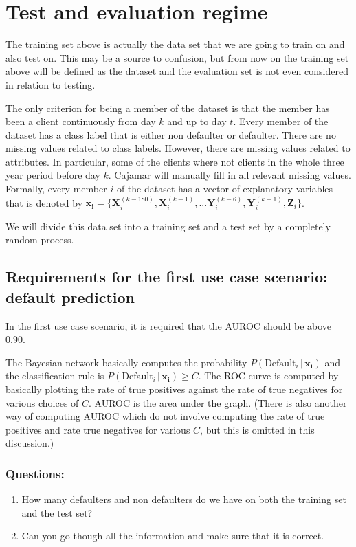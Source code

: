 \documentclass{article}
\theoremstyle{theorem}
\theoremstyle{definition}
\newcommand{\bv}[1]{\bm{#1}}
\newcommand{\X}{\mathbf{X}}
\newcommand{\Y}{\mathbf{Y}}
\newcommand{\Z}{\mathbf{Z}}
\begin{document}
{\section{Test and evaluation regime}

The training set above is actually the data set that we are going to train on and also test on. This may be a source to confusion, but from now on the training set above will be defined as the dataset and the evaluation set is not even considered in relation to testing. 

The only criterion for being a member of the dataset is that the member has been a client continuously from day $k$ and up to day $t$.  Every member of the dataset has a class label that is either non defaulter or defaulter.  There are no missing values related to class labels.  However, there are missing values related to attributes.  In particular, some of the clients where not clients in the whole three year period before day $k$.  Cajamar will manually fill in all relevant missing values.  Formally, every member $i$ of the dataset has a vector of explanatory variables that is denoted by $\bv{x_i} =\{ \X_i^{(k-180)},  \X_i^{(k-1)}, ...\Y_i^{(k-6)}, \Y_i^{(k-1)},\Z_i\}$.  

We will divide this data set into a training set and a test set by a completely random process.

\subsection{Requirements for the first use case scenario: default prediction}

In the first use case scenario, it is required that the AUROC should be above 0.90.
 
The Bayesian network basically computes the probability $P(\mbox{Default}_i \,|\, \bv{x_i})$ and the classification rule is
$P(\mbox{Default}_i \,|\, \bv{x_i}) \geq C$.  The ROC curve is computed by basically plotting the rate of true positives against the rate of true negatives for various choices of $C$.  AUROC is the area under the graph.  (There is also another way of computing AUROC which do not involve computing the rate of true positives and rate true negatives for various $C$, but this is omitted in this discussion.)

\subsubsection*{Questions: }
\begin{enumerate}
\item How many defaulters and non defaulters do we have on both the training set and the test set?
\item Can you go though all the information and make sure that it is correct.
\end{enumerate}


}
\end{document}
